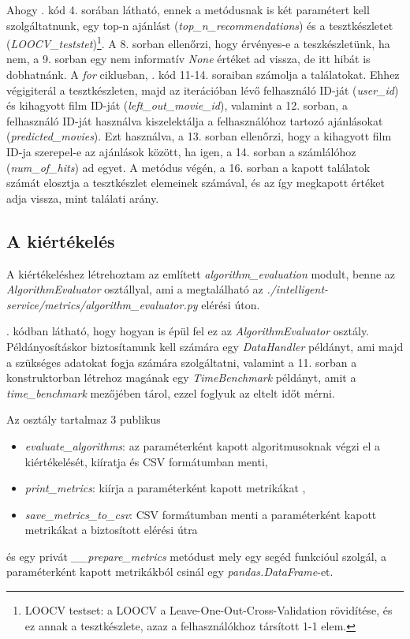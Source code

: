 \documentclass[
]{thesis-ekf}
\theoremstyle{definition}
\theoremstyle{remark}
\begin{document}
Ahogy . kód 4. sorában látható, ennek a metódusnak is két paramétert kell szolgáltatnunk, egy top-n ajánlást (\emph{top\_n\_recommendations}) és a tesztkészletet (\emph{LOOCV\_teststet})\footnote{LOOCV testset: a LOOCV a Leave-One-Out-Cross-Validation rövidítése, és ez annak a tesztkészlete, azaz a felhasználókhoz társított 1-1 elem.}. A 8. sorban ellenőrzi, hogy érvényes-e a teszkészletünk, ha nem, a 9. sorban egy nem informatív \emph{None} értéket ad vissza, de itt hibát is dobhatnánk. A \emph{for} ciklusban, . kód 11-14. soraiban számolja a találatokat. Ehhez végigiterál a tesztkészleten, majd az iterációban lévő felhasználó ID-ját (\emph{user\_id}) és kihagyott film ID-ját (\emph{left\_out\_movie\_id}), valamint a 12. sorban, a felhasználó ID-ját használva kiszelektálja a felhasználóhoz tartozó ajánlásokat (\emph{predicted\_movies}). Ezt használva, a 13. sorban ellenőrzi, hogy a kihagyott film ID-ja szerepel-e az ajánlások között, ha igen, a 14. sorban a számlálóhoz (\emph{num\_of\_hits}) ad egyet. A metódus végén, a 16. sorban a kapott találatok számát elosztja a tesztkészlet elemeinek számával, és az így megkapott értéket adja vissza, mint találati arány.

\subsection{A kiértékelés}
A kiértékeléshez létrehoztam az említett \emph{algorithm\_evaluation} modult, benne az \emph{AlgorithmEvaluator} osztállyal, ami a megtalálható az \emph{./intelligent-service\allowbreak/metrics\allowbreak/algorithm\allowbreak\_evaluator.py} elérési úton.



. kódban látható, hogy hogyan is épül fel ez az \emph{AlgorithmEvaluator} osztály. Példányosításkor biztosítanunk kell számára egy \emph{DataHandler} példányt, ami majd a szükséges adatokat fogja számára szolgáltatni, valamint a 11. sorban a konstruktorban létrehoz magának egy \emph{TimeBenchmark} példányt, amit a \emph{time\_benchmark} mezőjében tárol, ezzel foglyuk az eltelt időt mérni.

Az osztály tartalmaz 3 publikus
\begin{itemize}
	\item \emph{evaluate\_algorithms}: az paraméterként kapott algoritmusoknak végzi el a kiértékelését, kiíratja és CSV formátumban menti,
	\item \emph{print\_metrics}: kiírja a paraméterként kapott metrikákat ,
	\item \emph{save\_metrics\_to\_csv}: CSV formátumban menti a paraméterként kapott metrikákat a biztosított elérési útra
\end{itemize}
és egy privát \emph{\_\_prepare\_metrics} metódust mely egy segéd funkcióul szolgál, a paraméterként kapott metrikákból csinál egy \emph{pandas.DataFrame}-et.
\end{document}

